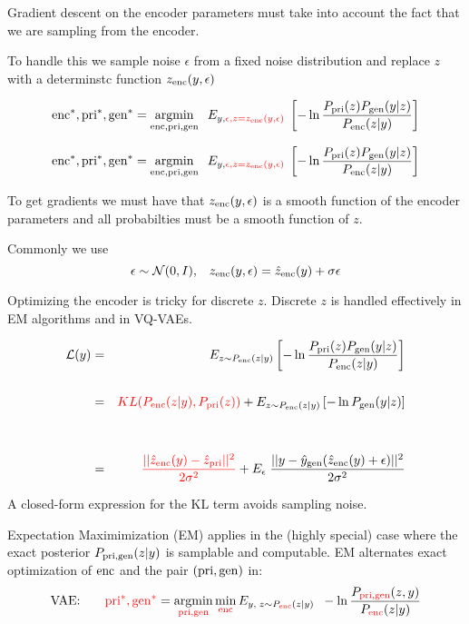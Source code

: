 {\vfill
Gradient descent on the encoder parameters must take into account the fact that we are sampling from the encoder.

\vfill
To handle this we sample noise $\epsilon$ from a fixed noise distribution and replace $z$ with a determinstc function $z_{\mathrm{enc}}(y,\epsilon)$

\vfill
$$\mathrm{enc}^*,\mathrm{pri}^*,\mathrm{gen}^* = \operatorname*{argmin}_{\mathrm{enc},\mathrm{pri},\mathrm{gen}}\;\;E_{y,{\color{red} \epsilon,z=z_{\mathrm{enc}}(y,\epsilon)}}\;\left[- \ln \frac{P_{\mathrm{pri}}(z)P_{\mathrm{gen}}(y|z)}{P_{\mathrm{enc}}(z|y)}\right]$$


$$\mathrm{enc}^*,\mathrm{pri}^*,\mathrm{gen}^* = \operatorname*{argmin}_{\mathrm{enc},\mathrm{pri},\mathrm{gen}}\;\;E_{y,{\color{red} \epsilon,z=z_{\mathrm{enc}}(y,\epsilon)}}\;\left[- \ln \frac{P_{\mathrm{pri}}(z)P_{\mathrm{gen}}(y|z)}{P_{\mathrm{enc}}(z|y)}\right]$$

\vfill
To get gradients we must have that $z_{\mathrm{enc}}(y,\epsilon)$ is a smooth function of the encoder parameters and all probabilties must be a smooth function of $z$.

\vfill
Commonly we use 
$$\epsilon \sim {\cal N}(0,I),\;\;\;z_{\mathrm{enc}}(y,\epsilon) = \hat{z}_{\mathrm{enc}}(y) + \sigma\epsilon$$

\vfill
Optimizing the encoder is tricky for discrete $z$.  Discrete $z$ is handled effectively in EM algorithms and in VQ-VAEs.

\vfill
\begin{eqnarray*}
{\cal L}(y) & = & E_{z \sim P_{\mathrm{enc}}(z|y)}\left[ - \ln \frac{P_{\mathrm{pri}}(z)P_{\mathrm{gen}}(y|z)}{P_{\mathrm{enc}}(z|y)}\right] \\
\\
& = & {\color{red} KL(P_{\mathrm{enc}}(z|y),P_{\mathrm{pri}}(z))} + E_{z \sim P_{\mathrm{enc}}(z|y)}\left[- \ln P_{\mathrm{gen}}(y|z)\right] \\
\\
\\
&=& {\color{red} \frac{||\hat{z}_{\mathrm{enc}}(y) - \hat{z}_{\mathrm{pri}}||^2}{2\sigma^2}} + E_\epsilon\;\frac{||y - \hat{y}_{\mathrm{gen}}(\hat{z}_{\mathrm{enc}}(y) + \epsilon)||^2}{2\sigma^2}
\end{eqnarray*}

\vfill
A closed-form expression for the KL term avoids sampling noise.


Expectation Maximimization (EM) applies in the (highly special) case where the exact posterior $P_{\mathrm{pri},\mathrm{gen}}(z|y)$ is samplable and computable.
EM alternates exact optimization of $\mathrm{enc}$ and the pair $(\mathrm{pri},\mathrm{gen})$ in:
$$\mbox{VAE:}\;\;\;\;\;\;\; {\color{red} \mathrm{pri}^*,\mathrm{gen}^*} = \operatorname*{argmin}_{\color{red} \mathrm{pri},\mathrm{gen}} \min_{\color{red} \mathrm{enc}} E_{y,\;z \sim P_{\color{red} \mathrm{enc}}(z|y)}\;\;- \ln \frac{P_{\color{red} \mathrm{pri},\mathrm{gen}}(z,y)}{P_{\color{red} \mathrm{enc}}(z|y)}$$

}
